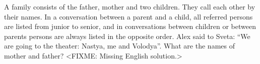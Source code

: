 \problem{}
A family consists of the father, mother and two children.
They call each other by their names.
In a conversation between a parent and a child, all referred persons are listed from junior to senior,
and in conversations between children or between parents persons are always listed in the opposite order.
Alex said to Sveta: ``We are going to the theater: Nastya, me and Volodya''.
What are the names of mother and father?
\solution
<FIXME: Missing English solution.>
\endproblem
